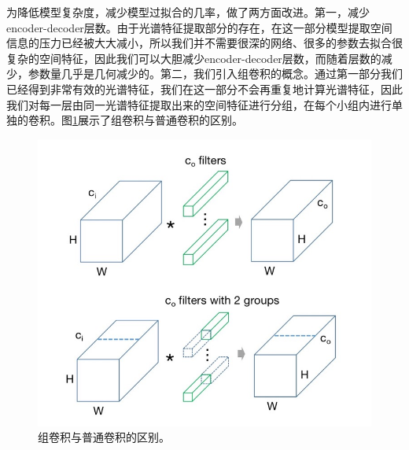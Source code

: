 \documentclass[UTF8]{ctexart}
\begin{document}
为降低模型复杂度，减少模型过拟合的几率，做了两方面改进。第一，减少encoder-decoder层数。由于光谱特征提取部分的存在，在这一部分模型提取空间信息的压力已经被大大减小，所以我们并不需要很深的网络、很多的参数去拟合很复杂的空间特征，因此我们可以大胆减少encoder-decoder层数，而随着层数的减少，参数量几乎是几何减少的。第二，我们引入组卷积的概念。通过第一部分我们已经得到非常有效的光谱特征，我们在这一部分不会再重复地计算光谱特征，因此我们对每一层由同一光谱特征提取出来的空间特征进行分组，在每个小组内进行单独的卷积。图\ref{pic:GC}展示了组卷积与普通卷积的区别。

\begin{figure}[H]
    \centering
    \includegraphics[scale=0.3]{../pic/conv.jpg}
    \caption[]{组卷积与普通卷积的区别。}
    \label{pic:GC}
\end{figure}


\end{document}
